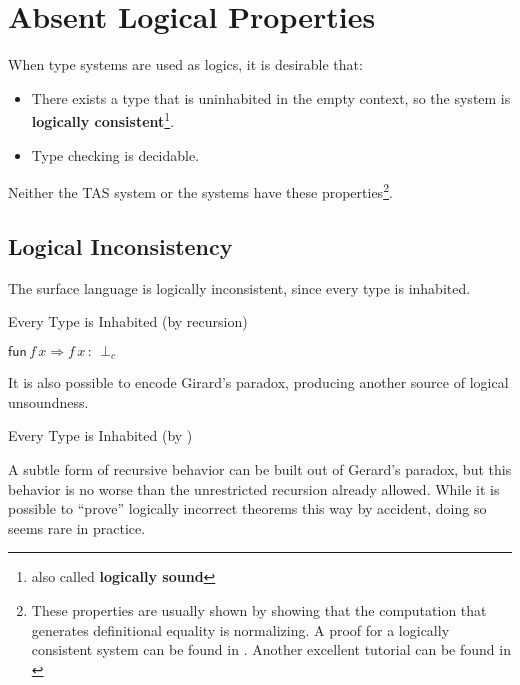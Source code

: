 \section{Absent Logical Properties}
 
When type systems are used as logics, it is desirable that:
\begin{itemize}
\item There exists a type that is uninhabited in the empty context, so the system is \textbf{logically consistent}\footnote{also called \textbf{logically sound}}.
\item Type checking is decidable.
\end{itemize}
Neither the \ac{TAS} system or the \bidir{} systems have these properties\footnote{
 These properties are usually shown by showing that the computation that generates definitional equality is normalizing.
 A proof for a logically consistent system can be found in \cite[Chapter 4]{luo1994computation}.
 Another excellent tutorial can be found in \cite[Chapter 2]{casinghino2014combiningthesis}}.
 
\subsection{Logical Inconsistency}
 
The surface language is logically inconsistent, since every type is inhabited.
 
\begin{example}
Every Type is Inhabited (by recursion)
 
$\mathsf{fun}\,f\,x\Rightarrow f\,x\,:\,\perp_{c}$
\end{example}
 
It is also possible to encode Girard's paradox, producing another source of logical unsoundness.
\begin{example}
Every Type is Inhabited (by \tit{})
 
 
\end{example}
 
A subtle form of recursive behavior can be built out of Gerard's paradox\cite{Reinhold89typecheckingis}, but this behavior is no worse than the unrestricted recursion already allowed.
While it is possible to ``prove'' logically incorrect theorems this way by accident, doing so seems rare in practice.
 

